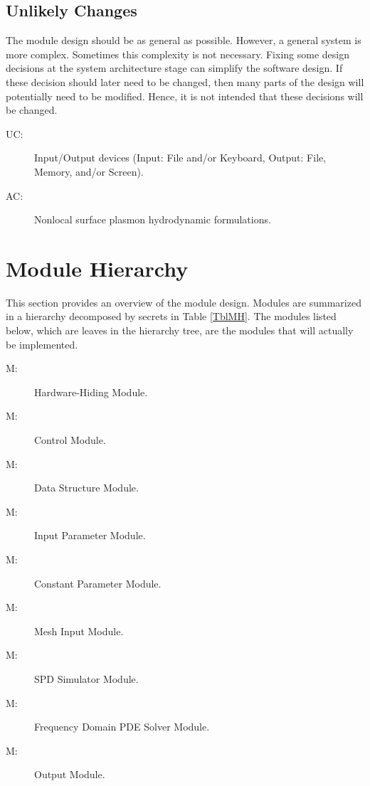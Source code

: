 \documentclass[12pt, titlepage]{article}
\newcounter{acnum}
\newcommand{\actheacnum}{AC\theacnum}
\newcounter{ucnum}
\newcommand{\uctheucnum}{UC\theucnum}
\newcounter{mnum}
\newcommand{\mthemnum}{M\themnum}
\begin{document}
\subsection{Unlikely Changes} \label{SecUchange}

The module design should be as general as possible. However, a general system is
more complex. Sometimes this complexity is not necessary. Fixing some design
decisions at the system architecture stage can simplify the software design. If
these decision should later need to be changed, then many parts of the design
will potentially need to be modified. Hence, it is not intended that these
decisions will be changed.

\begin{description}
\item[ \uctheucnum \label{ucIO}:] Input/Output devices
  (Input: File and/or Keyboard, Output: File, Memory, and/or Screen).
\item[ \actheacnum \label{acForm}:] Nonlocal surface plasmon hydrodynamic formulations.
\end{description}


\section{Module Hierarchy} \label{SecMH}

This section provides an overview of the module design. Modules are summarized
in a hierarchy decomposed by secrets in Table \ref{TblMH}. The modules listed
below, which are leaves in the hierarchy tree, are the modules that will
actually be implemented.

\begin{description}
\item [ \mthemnum \label{mHH}:] Hardware-Hiding Module.

\item [ \mthemnum \label{mSC}:] \progname{} Control Module.

\item [ \mthemnum \label{mDS}:] Data Structure Module.

\item [ \mthemnum \label{mIP}:] Input Parameter Module.

\item [ \mthemnum \label{mCP}:] Constant Parameter Module.

\item [ \mthemnum \label{mMI}:] Mesh Input Module.

\item [ \mthemnum \label{mSS}:] SPD Simulator Module.


\item [ \mthemnum \label{mFD}:] Frequency Domain PDE Solver Module.

\item [ \mthemnum \label{mOut}:] Output Module.

\end{description}
\end{document}
